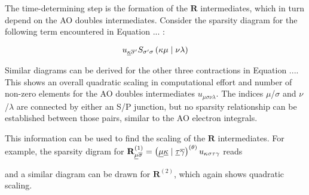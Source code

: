 The time-determining step is the formation of the $\mathbf{R}$ intermediates, which in turn depend on the AO doubles intermediates. Consider the sparsity diagram for the following term encountered in Equation ... :

\begin{equation}
u_{\underline{\kappa}\overline{\sigma}'} S_{\sigma'\sigma} \left( \kappa \mu \mid \nu\lambda \right)
\end{equation}

\begin{center}
\end{center}
\noindent Similar diagrams can be derived for the other three contractions in Equation .... This shows an overall quadratic scaling in computational effort and number of non-zero elements for the AO doubles intermediates $u_{\mu\sigma\nu\lambda}$. The indices $\mu$/$\sigma$ and $\nu$/$\lambda$ are connected by either an S/P junction, but no sparsity relationship can be established between those pairs, similar to the AO electron integrals.  

This information can be used to find the scaling of the $\mathbf{R}$ intermediates. For example, the sparsity digram for $\mathbf{R}_{\underline{\mu}\overline{\sigma}}^{(1)} = \left( \underline{\mu}\underline{\kappa} \mid \underline{\tau}\overline{\gamma} \right)^{(\theta)} u_{\kappa\sigma\tau\gamma}$ reads
\begin{center}
\end{center}
\noindent and a similar diagram can be drawn for $\mathbf{R}^{(2)}$, which again shows quadratic scaling. 

